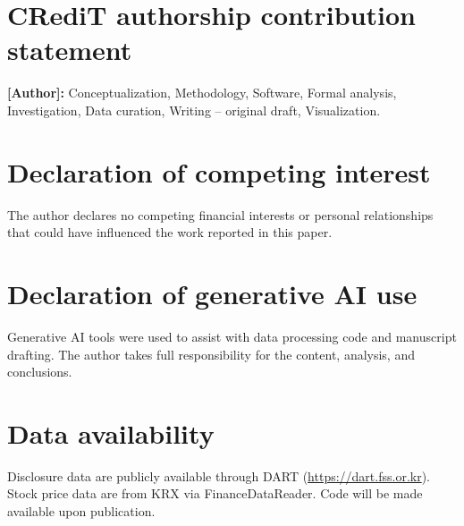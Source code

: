 \documentclass[review,authoryear]{elsarticle}
\begin{document}
\section*{CRediT authorship contribution statement}
\textbf{[Author]:} Conceptualization, Methodology, Software, Formal analysis, Investigation, Data curation, Writing -- original draft, Visualization.

\section*{Declaration of competing interest}
The author declares no competing financial interests or personal relationships that could have influenced the work reported in this paper.

\section*{Declaration of generative AI use}
Generative AI tools were used to assist with data processing code and manuscript drafting. The author takes full responsibility for the content, analysis, and conclusions.

\section*{Data availability}
Disclosure data are publicly available through DART (\url{https://dart.fss.or.kr}). Stock price data are from KRX via FinanceDataReader. Code will be made available upon publication.



\end{document}
